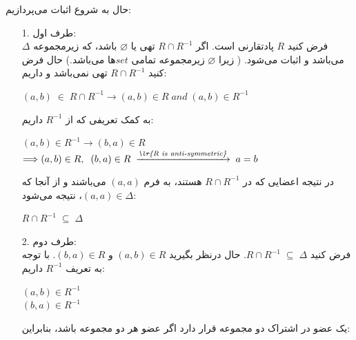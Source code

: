 \begin{enumerate}
\begin{latin}
\begin{itemize}
        \end{itemize}
    \end{latin}
    حال به شروع اثبات می‌پردازیم:\\[0.06in]
    \begin{enumerate}
        \item[1.] طرف اول:\\[0.1in]
        فرض کنید $R$ پادتقارنی است. اگر 
        $R \cap R^{-1}$ تهی یا $\varnothing$ باشد، که زیرمجموعه $\Delta$ می‌باشد و اثبات می‌شود.
        ( زیرا $\varnothing$ زیرمجموعه تمامی $set$ها می‌باشد.)
        حال فرض کنید $R \cap R^{-1}$ تهی نمی‌باشد و داریم:\\[0.07in]
        \begin{center}
            $(a,b) \;\in\; R \cap R^{-1} \longrightarrow
            (a,b)\in R\; \textit{and}\; (a,b)\in R^{-1}$\\[0.15in]
        \end{center}
        به کمک تعریفی که از $R^{-1}$ داریم:\\[0.01in]
        \begin{center}
            $(a,b)\in R^{-1} \longrightarrow (b,a)\in R$\\[0.08in]
            $\Longrightarrow (a,b)\in R,\;\;(b,a) \in R\;
            \xrightarrow{\textit{\lr{R is anti-symmetric}}}\; a=b$
            \\[0.1in]
        \end{center}
        در نتیجه اعضایی که در $R \cap R^{-1}$ هستند، به فرم $(a, a)$
        می‌باشند و از آنجا که 
        $(a,a)\in \Delta$،
        نتیجه می‌شود:\\[0.1in]
        \begin{center}
            $R \cap R^{-1} \; \subseteq\; \Delta$\\[0.1in]
        \end{center}
    \item[2.] طرف دوم: \\[0.1in]
    فرض کنید 
    $R \cap R^{-1} \; \subseteq\; \Delta$.
    حال درنظر بگیرید
    $(a,b)\in R$ و
    $(b,a)\in R$.
    با توجه به تعریف $R^{-1}$
    داریم:\\[0.1in]
    \begin{center}
        $(a,b)\in R^{-1}$\\[0.05in]
        $(b,a)\in R^{-1}$\\[0.15in]
    \end{center}
    یک عضو در اشتراک دو مجموعه قرار دارد اگر عضو هر دو مجموعه باشد، بنابراین:\\[0.05in]

\end{enumerate}
\end{enumerate}
